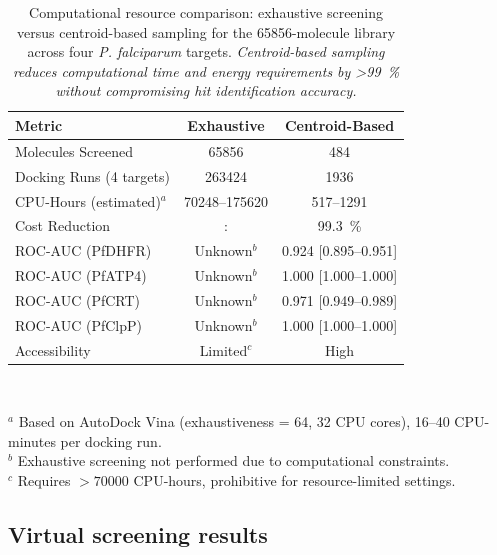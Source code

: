 \documentclass[journal=jcisd8,manuscript=suppinfo]{achemso}
\begin{document}
\begin{table}[ht]
\centering
\caption{Computational resource comparison: exhaustive screening versus centroid-based sampling for the \num{65856}-molecule library across four \textit{P. falciparum} targets. \textit{Centroid-based sampling reduces computational time and energy requirements by >\qty{99}{\percent} without compromising hit identification accuracy.}}
\label{tab:computational_comparison}
\small
\begin{tabular}{lcc}
\toprule
\textbf{Metric} & \textbf{Exhaustive} & \textbf{Centroid-Based} \\
\midrule
Molecules Screened & \num{65856} & \num{484} \\
Docking Runs (4 targets) & \num{263424} & \num{1936} \\
CPU-Hours (estimated)$^a$ & \numrange{70248}{175620} & \numrange{517}{1291} \\
Cost Reduction & : & \qty{99.3}{\percent} \\
\midrule
ROC-AUC (PfDHFR) & Unknown$^b$ & \num{0.924} [\numrange{0.895}{0.951}] \\
ROC-AUC (PfATP4) & Unknown$^b$ & \num{1.000} [\numrange{1.000}{1.000}] \\
ROC-AUC (PfCRT) & Unknown$^b$ & \num{0.971} [\numrange{0.949}{0.989}] \\
ROC-AUC (PfClpP) & Unknown$^b$ & \num{1.000} [\numrange{1.000}{1.000}] \\
\midrule
Accessibility & Limited$^c$ & High \\
\bottomrule
\end{tabular}
\vspace{0.3em}\\
\begin{footnotesize}
$^a$ Based on AutoDock Vina (exhaustiveness = \num{64}, \num{32} CPU cores), \numrange{16}{40} CPU-minutes per docking run.\\
$^b$ Exhaustive screening not performed due to computational constraints.\\
$^c$ Requires $>\num{70000}$ CPU-hours, prohibitive for resource-limited settings.
\end{footnotesize}
\end{table}

\subsection*{Virtual screening results}
\end{document}
